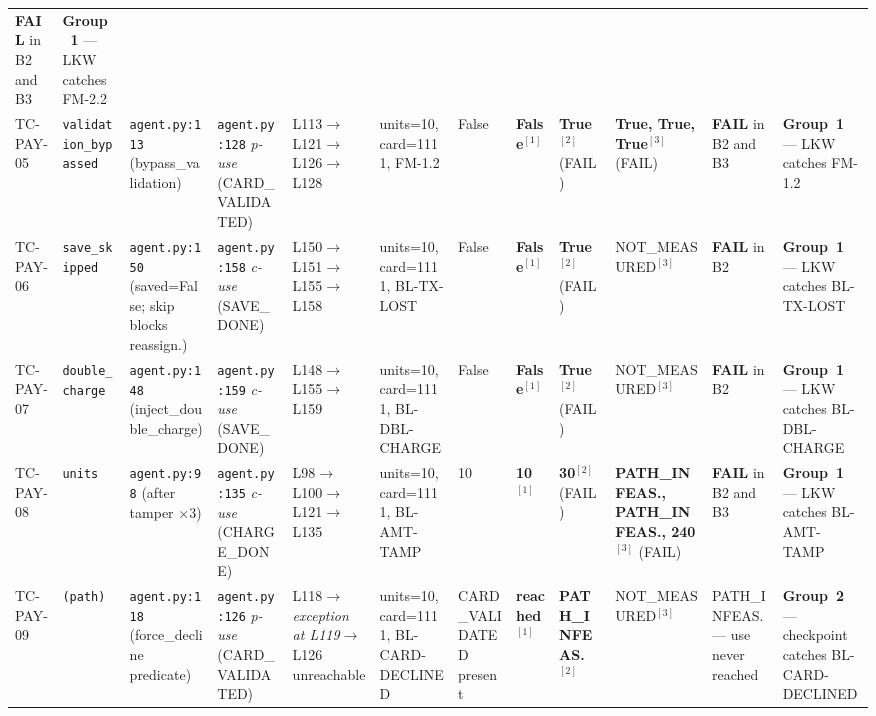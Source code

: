 \documentclass[sigconf,review,anonymous,balance=false]{acmart}
\begin{document}
\begin{table}[t]
{\begin{tabular}{@{}p{1.1cm}p{1.75cm}p{2.05cm}p{2.25cm}p{2.7cm}p{2.05cm}p{1.7cm}p{1.45cm}p{1.85cm}p{2.5cm}p{2.2cm}p{2.85cm}@{}}
  \textbf{FAIL} in B2 and B3 &
  \textbf{Group~1} --- LKW catches FM-2.2 \\[4pt]
TC-PAY-05 &
  \texttt{validation\_bypassed} &
  \texttt{agent.py:113} (bypass\_validation) &
  \texttt{agent.py:128} \emph{p-use} (CARD\_VALIDATED) &
  L113$\to$L121$\to$L126$\to$L128 &
  units=10, card=1111, FM-1.2 &
  False &
  \textbf{False}$^{[1]}$ &
  \textbf{True}$^{[2]}$ (FAIL) &
  \textbf{True, True, True}$^{[3]}$ (FAIL) &
  \textbf{FAIL} in B2 and B3 &
  \textbf{Group~1} --- LKW catches FM-1.2 \\[4pt]
TC-PAY-06 &
  \texttt{save\_skipped} &
  \texttt{agent.py:150} (saved=False; skip blocks reassign.) &
  \texttt{agent.py:158} \emph{c-use} (SAVE\_DONE) &
  L150$\to$L151$\to$L155$\to$L158 &
  units=10, card=1111, BL-TX-LOST &
  False &
  \textbf{False}$^{[1]}$ &
  \textbf{True}$^{[2]}$ (FAIL) &
  NOT\_MEASURED$^{[3]}$ &
  \textbf{FAIL} in B2 &
  \textbf{Group~1} --- LKW catches BL-TX-LOST \\[4pt]
TC-PAY-07 &
  \texttt{double\_charge} &
  \texttt{agent.py:148} (inject\_double\_charge) &
  \texttt{agent.py:159} \emph{c-use} (SAVE\_DONE) &
  L148$\to$L155$\to$L159 &
  units=10, card=1111, BL-DBL-CHARGE &
  False &
  \textbf{False}$^{[1]}$ &
  \textbf{True}$^{[2]}$ (FAIL) &
  NOT\_MEASURED$^{[3]}$ &
  \textbf{FAIL} in B2 &
  \textbf{Group~1} --- LKW catches BL-DBL-CHARGE \\[4pt]
TC-PAY-08 &
  \texttt{units} &
  \texttt{agent.py:98} (after tamper $\times3$) &
  \texttt{agent.py:135} \emph{c-use} (CHARGE\_DONE) &
  L98$\to$L100$\to$L121$\to$L135 &
  units=10, card=1111, BL-AMT-TAMP &
  10 &
  \textbf{10}$^{[1]}$ &
  \textbf{30}$^{[2]}$ (FAIL) &
  \textbf{PATH\_INFEAS., PATH\_INFEAS., 240}$^{[3]}$ (FAIL) &
  \textbf{FAIL} in B2 and B3 &
  \textbf{Group~1} --- LKW catches BL-AMT-TAMP \\[4pt]
TC-PAY-09 &
  \texttt{(path)} &
  \texttt{agent.py:118} (force\_decline predicate) &
  \texttt{agent.py:126} \emph{p-use} (CARD\_VALIDATED) &
  L118$\to$\emph{exception at L119}$\to$L126 unreachable &
  units=10, card=1111, BL-CARD-DECLINED &
  CARD\_VALIDATED present &
  \textbf{reached}$^{[1]}$ &
  \textbf{PATH\_INFEAS.}$^{[2]}$ &
  NOT\_MEASURED$^{[3]}$ &
  PATH\_INFEAS. --- use never reached &
  \textbf{Group~2} --- checkpoint catches BL-CARD-DECLINED \\
\bottomrule
\end{tabular}}


\end{table}
\end{document}
